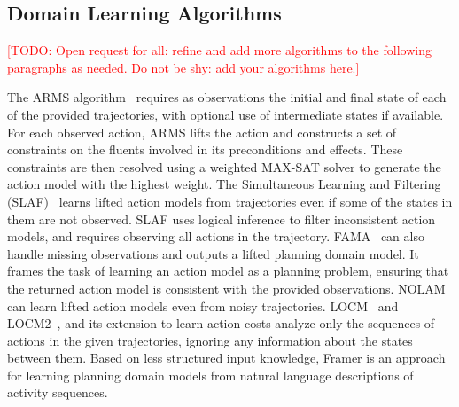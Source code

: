 \documentclass{article}
\theoremstyle{definition}
\theoremstyle{remark}
\newcommand{\todo}[1]{{\textcolor{red}{[TODO: #1]}}}
\begin{document}
\subsection{Domain Learning Algorithms}

\todo{Open request for all: refine and add more algorithms to the following paragraphs as needed. Do not be shy: add your algorithms here.}

The ARMS algorithm~\citep{yang2007learning} requires as observations the initial and final state of each of the provided trajectories, with optional use of intermediate states if available. For each observed action, ARMS lifts the action and constructs a set of constraints on the fluents involved in its preconditions and effects. These constraints are then resolved using a weighted MAX-SAT solver to generate the action model with the highest weight.
The Simultaneous Learning and Filtering (SLAF)~\citep{amir2008learning} learns lifted action models from trajectories even if some of the states in them are not observed. 
SLAF uses logical inference to filter inconsistent action models, and requires observing all actions in the trajectory.  
FAMA~\citep{aineto2019learning} can also handle missing observations and outputs a lifted planning domain model. 
It frames the task of learning an action model as a planning problem, ensuring that the returned action model is consistent with the provided observations.
NOLAM~\citep{Lamanna24} can learn lifted action models even from noisy trajectories. 
LOCM~\citep{cresswell2011generalised} and LOCM2~\citep{cresswell2013acquiring}, and its extension to learn action costs \citep{gregory2016domain} analyze only the sequences of actions in the given trajectories, ignoring any information about the states between them. 
Based on less structured input knowledge, Framer \citep{lindsay2017framer} is an approach for learning planning domain models from natural language descriptions of activity sequences.
\end{document}
